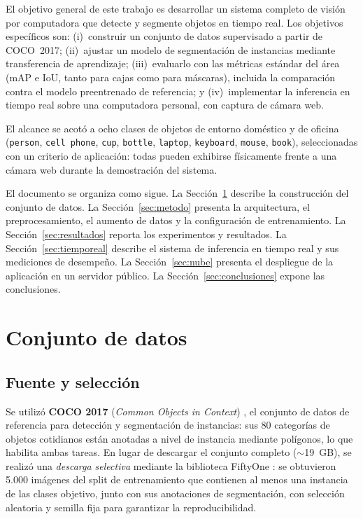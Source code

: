 \documentclass[11pt,a4paper]{article}
\begin{document}
El objetivo general de este trabajo es desarrollar un sistema completo de
visión por computadora que detecte y segmente objetos en tiempo real. Los
objetivos específicos son: (i)~construir un conjunto de datos supervisado a
partir de COCO~2017; (ii)~ajustar un modelo de segmentación de instancias
mediante transferencia de aprendizaje; (iii)~evaluarlo con las métricas
estándar del área (mAP e IoU, tanto para cajas como para máscaras), incluida
la comparación contra el modelo preentrenado de referencia; y (iv)~implementar
la inferencia en tiempo real sobre una computadora personal, con captura de
cámara web.

El alcance se acotó a ocho clases de objetos de entorno doméstico y de
oficina (\texttt{person}, \texttt{cell phone}, \texttt{cup}, \texttt{bottle},
\texttt{laptop}, \texttt{keyboard}, \texttt{mouse}, \texttt{book}),
seleccionadas con un criterio de aplicación: todas pueden exhibirse
físicamente frente a una cámara web durante la demostración del sistema.

El documento se organiza como sigue. La Sección~\ref{sec:datos} describe la
construcción del conjunto de datos. La Sección~\ref{sec:metodo} presenta la
arquitectura, el preprocesamiento, el aumento de datos y la configuración de
entrenamiento. La Sección~\ref{sec:resultados} reporta los experimentos y
resultados. La Sección~\ref{sec:tiemporeal} describe el sistema de inferencia
en tiempo real y sus mediciones de desempeño. La Sección~\ref{sec:nube}
presenta el despliegue de la aplicación en un servidor público. La
Sección~\ref{sec:conclusiones} expone las conclusiones.

\section{Conjunto de datos}
\label{sec:datos}

\subsection{Fuente y selección}

Se utilizó \textbf{COCO 2017} (\emph{Common Objects in Context})
\cite{lin2014coco}, el conjunto de datos de referencia para detección y
segmentación de instancias: sus 80 categorías de objetos cotidianos están
anotadas a nivel de instancia mediante polígonos, lo que habilita ambas
tareas. En lugar de descargar el conjunto completo ($\sim$19~GB), se realizó
una \emph{descarga selectiva} mediante la biblioteca FiftyOne
\cite{moore2020fiftyone}: se obtuvieron 5.000 imágenes del split de
entrenamiento que contienen al menos una instancia de las clases objetivo,
junto con sus anotaciones de segmentación, con selección aleatoria y semilla
fija para garantizar la reproducibilidad.
\end{document}

